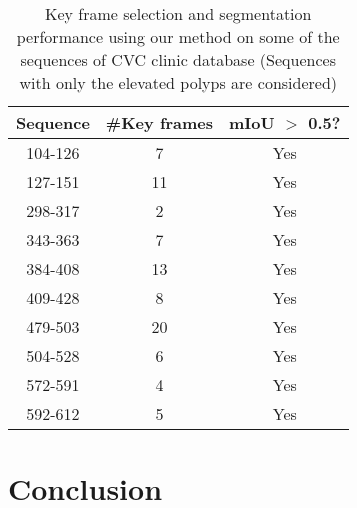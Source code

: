 \documentclass[journal]{IEEEtran}
\begin{document}
\begin{table}[]
\centering
\caption{Key frame selection and segmentation performance using our method on some of the sequences of CVC clinic database (Sequences with only the elevated polyps are considered)}
\begin{tabular}{ccc}
\hline\hline
\multicolumn{1}{l}{\textbf{Sequence}} & \multicolumn{1}{l}{\textbf{\#Key frames}}  & \multicolumn{1}{l}{\textbf{mIoU $>$ 0.5?}} \\ \hline
104-126                               & 7                                        & Yes                                      \\ \hline
127-151                               & 11                                       & Yes                                      \\ \hline
298-317                               & 2                                        & Yes                                      \\ \hline
343-363                               & 7                                        & Yes                                      \\ \hline
384-408                               & 13                                       & Yes                                      \\ \hline
409-428                               & 8                                        & Yes                                      \\ \hline
479-503                               & 20                                       & Yes                                      \\ \hline
504-528                               & 6                                        & Yes                                      \\ \hline
572-591                               & 4                                        & Yes                                      \\ \hline
592-612                               & 5                                        & Yes                                      \\ \hline
\end{tabular}
\label{tab:performance}
\end{table}
\section{Conclusion}
\end{document}
